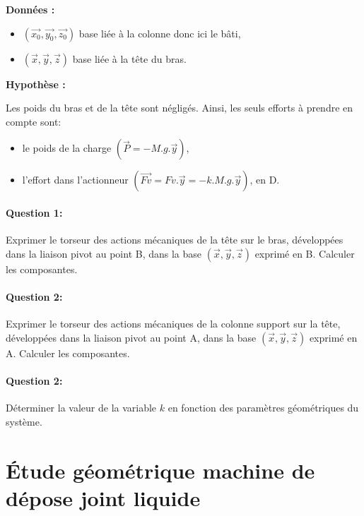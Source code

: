 \textbf{Données :}
\begin{itemize}
 \item $(\overrightarrow{x_0},\overrightarrow{y_0},\overrightarrow{z_0})$ base liée à la colonne donc ici le bâti,
 \item $(\overrightarrow{x},\overrightarrow{y},\overrightarrow{z})$ base liée à la tête du bras.
\end{itemize}

\textbf{Hypothèse :}

Les poids du bras et de la tête sont négligés. Ainsi, les seuls efforts à prendre en compte sont:
\begin{itemize}
 \item le poids de la charge $(\overrightarrow{P}=-M.g.\overrightarrow{y})$,
 \item l'effort dans l'actionneur $(\overrightarrow{Fv}=Fv.\overrightarrow{y}=-k.M.g.\overrightarrow{y})$, en D.
\end{itemize}

\newpage

\paragraph{Question 1:} Exprimer le torseur des actions mécaniques de la tête sur le bras, développées dans la liaison pivot au point B, dans la base $(\overrightarrow{x},\overrightarrow{y},\overrightarrow{z})$ exprimé en B. Calculer les composantes.

\paragraph{Question 2:} Exprimer le torseur des actions mécaniques de la colonne support sur la tête, développées dans la liaison pivot au point A, dans la base $(\overrightarrow{x},\overrightarrow{y},\overrightarrow{z})$ exprimé en A. Calculer les composantes.

\paragraph{Question 2:} Déterminer la valeur de la variable $k$ en fonction des paramètres géométriques du système.

\newpage

\section{Étude géométrique machine de dépose joint liquide}

